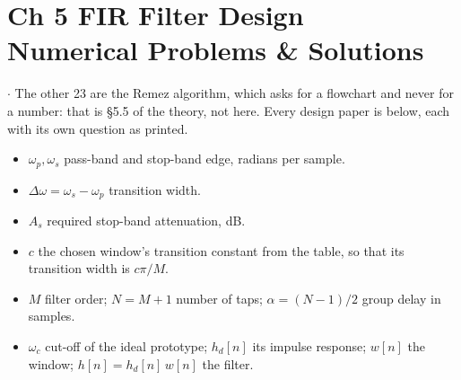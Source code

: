 %
\section*{\color{acc}Ch 5 \textperiodcentered{} FIR Filter Design\\[2pt]
{\large\textcolor{sub}{Numerical Problems \& Solutions}}}
\vspace{-4pt}{\color{acc}\rule{\textwidth}{1.1pt}}\vspace{4pt}

{\color{sub}\footnotesize {} \gap$\cdot$\gap {} The
other 23 are the Remez algorithm, which asks for a flowchart and never for a number:
that is \S5.5 of the theory, not here. Every design paper is below, each with its own
question as printed.}

\begin{itemize}
  \item $\omega_p,\omega_s$ \gap pass-band and stop-band edge, radians per sample.
  \item $\Delta\omega=\omega_s-\omega_p$ \gap transition width. 
  \item $A_s$ \gap required stop-band attenuation, dB. 
  \item $c$ \gap the chosen window's transition constant from the table, so that its
        transition width is $c\pi/M$.
  \item $M$ \gap filter order; $N=M+1$ \gap number of taps; $\alpha=(N-1)/2$ \gap group
        delay in samples.
  \item $\omega_c$ \gap cut-off of the ideal prototype; $h_d[n]$ its impulse response;
        $w[n]$ the window; $h[n]=h_d[n]\,w[n]$ the filter.
\end{itemize}


